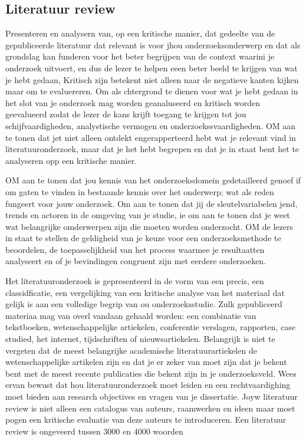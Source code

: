  


\subsection{Literatuur review}
 


Presenteren en analysern van, op een kritische manier, dat gedeelte van de gepubliceerde literatuur dat relevant is voor jhou onderzoeksonderwerp en dat als grondslag kan funderen voor het beter begrijpen van de context waarini je onderzoek uitvoert, en dus de lezer te helpen  eeen beter beeld te krijgen van wat je hebt gedaan,
Kritisch zijn betekent niet alleen naar de negatieve kanten kijken maar om te evaluereren.
Om als chtergrond te dienen voor wat je hebt gedaan in het slot van je onderzoek mag worden geanaluseerd en kritisch worden geevalueerd zodat de lezer de kans krijft toegang te krijgen tot jou schijfvaardigheden, analystische vermogen en onderzoekssvaardigheden.
OM aan te tonen dat jet niet alleen ontdekt engerapperteerd hebt wat je relevant vind in literatuuronderzoek, maar dat je het hebt begrepen en dat je in staat bent het te analyseren opp een kritische manier.


OM aan te tonen dat jou kennis van het onderzoeksdomein gedetailleerd genoef if om gaten te vinden in bestaande kennis over het onderwerp; wat als reden fungeert voor jouw onderzoek. Om aan te tonen dat jij de sleutelvariabelen jend, trends en actoren in de omgeving van je studie, ie om aan te tonen dat je weet wat belangrijke omderwerpen zijn  die moeten worden onderzocht.
OM de lezers in staat te stellen de geldigheid van je keuze voor een onderzoeksmethode te beoordelen, de toepasselijkheid van het process waarmee je resultaatten analyseert en of je bevindingen congruent zijn met eerdere onderzoeken.


Het literatuuronderzoek is gepresenteerd in de vorm van een precis, een classidficatie, een vergelijking van een kritische analyse van het materiaal dat gelijk is aan een volledige begrip van ou onderzoeksstudie. Zulk gepubliceerd materiaa mag van overl vandaan gehaald worden: een combinatie van tekstboeken, wetenschappelijke artiekelen, conferentie verslagen, rapporten, case studied, het internet, tijdschriften of nieuwsartiekelen. Belangrijk is niet te vergeten dat de meest belangrijke academische literatuurartiekelen de wetenschappelijke artikelen zijn en dat je er zeker van moet zijn dat je bekent bent met de meest recente publicaties die bekent zijn in je onderzoeksveld.
Wees ervan bewust dat hou literatuuronderzoek  moet leiden en een rechtvaardighing moet bieden aan research objectives en  vragen van je dissertatie. Joyw literatuur review is niet alleen een catalogus van auteurs, raamwerken en ideen maar moet pogen een kritische evaluatie van deze auteurs te introduceren.
Een literatuur review is ongeveerd tussen 3000 en 4000 woorden



